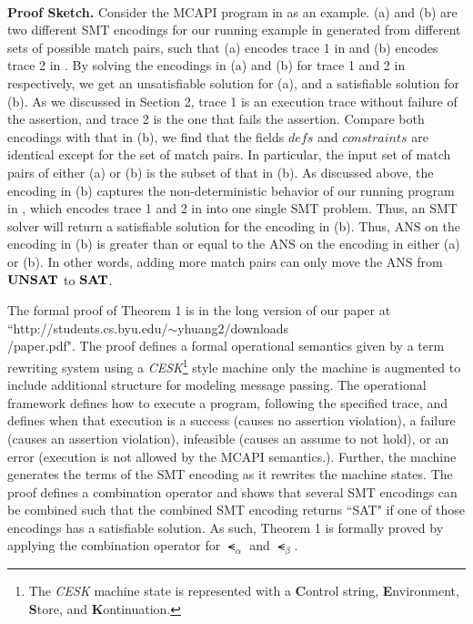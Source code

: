 \\
\textbf{Proof Sketch.}
Consider the MCAPI program in  as an example.
(a) and (b) are two different SMT encodings for our running
example in  generated from different sets of possible match pairs, such that (a) encodes trace 1 in  and (b) encodes trace 2 in . By solving the encodings in (a) and (b) for trace 1 and 2 in  respectively, we get an unsatisfiable solution for (a), and a satisfiable solution for (b). As we discussed in Section 2, trace 1 is an execution trace without failure of the assertion, and trace 2 is the one that fails the assertion. %
Compare both encodings with that in (b), we find that the fields $\mathit{defs}$ and $\mathit{constraints}$ are identical except for the set of match pairs. In particular, the input set of match pairs of either (a) or (b) is the subset of that in (b). As discussed above, the encoding in (b) captures the non-deterministic behavior of our running program in , which encodes trace 1 and 2 in  into one single SMT problem. Thus, an SMT solver will return a satisfiable solution for the encoding in (b). Thus, $\mathrm{ANS}$ on the encoding in (b) is greater than or equal to the $\mathrm{ANS}$ on the encoding in either (a) or (b). In other words, adding more match pairs can only move the $\mathrm{ANS}$ from $\mathrm{\textbf{UNSAT}}$ to $\mathrm{\textbf{SAT}}$.

The formal proof of Theorem 1 is in the long version of our paper at ``http://students.cs.byu.edu/$\sim$yhuang2/downloads\\/paper.pdf". The proof defines a formal operational semantics given by a term rewriting system using a \textit{CESK}\footnote{The \textit{CESK} machine state is represented with a \textbf{C}ontrol string, \textbf{E}nvironment, \textbf{S}tore, and \textbf{K}ontinuation.} style machine only the machine is augmented to include additional structure for modeling message passing. The operational framework defines how to execute a program, following the specified trace, and defines when that execution is a success (causes no assertion violation), a failure (causes an assertion violation), infeasible (causes an assume to not hold), or an error (execution is not allowed by the MCAPI semantics.). Further, the machine generates the terms of the SMT encoding as it rewrites the machine states. The proof defines a combination operator and shows that several SMT encodings can be combined such that the combined SMT encoding returns ``SAT" if one of those encodings has a satisfiable solution.  As such, Theorem 1 is formally proved by applying the combination operator for $\smt_{\alpha}$ and $\smt_{\beta}$.

